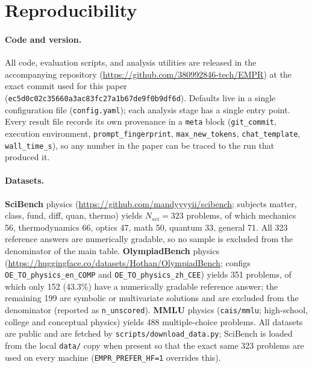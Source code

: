 \section{Reproducibility}
\label{sec:reproducibility}

\paragraph{Code and version.}
All code, evaluation scripts, and analysis utilities are released in the
accompanying repository (\url{https://github.com/380992846-tech/EMPR}) at the
exact commit used for this paper
(\texttt{ec5d0c02c35660a3ac83fc27a1b67de9f0b9df6d}). Defaults live in a single
configuration file (\texttt{config.yaml}); each analysis stage has a single
entry point. Every result file records its own provenance in a
\texttt{meta} block (\texttt{git\_commit}, execution environment,
\texttt{prompt\_fingerprint}, \texttt{max\_new\_tokens},
\texttt{chat\_template}, \texttt{wall\_time\_s}), so any number in the paper can
be traced to the run that produced it.

\paragraph{Datasets.}
\textbf{SciBench} physics (\url{https://github.com/mandyyyyii/scibench};
subjects matter, class, fund, diff, quan, thermo) yields $N_{sci}=323$
problems, of which mechanics 56, thermodynamics 66, optics 47, math 50,
quantum 33, general 71. All 323 reference answers are numerically gradable, so
no sample is excluded from the denominator of the main table.
\textbf{OlympiadBench} physics
(\url{https://huggingface.co/datasets/Hothan/OlympiadBench}; configs
\texttt{OE\_TO\_physics\_en\_COMP} and \texttt{OE\_TO\_physics\_zh\_CEE}) yields
351 problems, of which only 152 (43.3\%) have a numerically gradable reference
answer; the remaining 199 are symbolic or multivariate solutions and are
excluded from the denominator (reported as \texttt{n\_unscored}).
\textbf{MMLU} physics (\texttt{cais/mmlu}; high-school, college and conceptual
physics) yields 488 multiple-choice problems. All datasets are public and are
fetched by \texttt{scripts/download\_data.py}; SciBench is loaded from the local
\texttt{data/} copy when present so that the exact same 323 problems are used on
every machine (\texttt{EMPR\_PREFER\_HF=1} overrides this).

